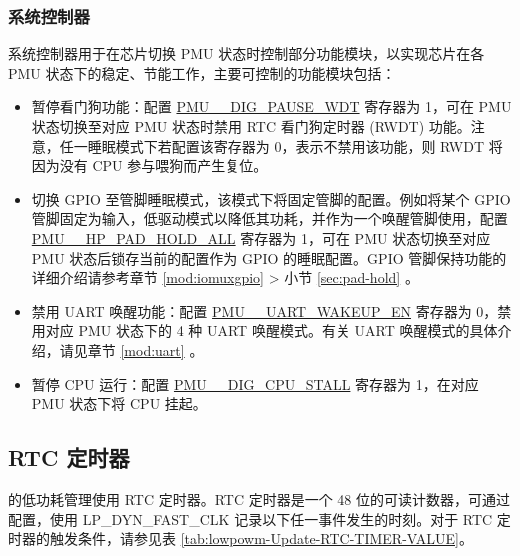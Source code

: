 \documentclass[main\_\_CN.tex]{subfiles}
\begin{document}
\subsubsection{系统控制器}

系统控制器用于在芯片切换 PMU 状态时控制部分功能模块，以实现芯片在各 PMU 状态下的稳定、节能工作，主要可控制的功能模块包括：

\begin{itemize}
    \item 暂停看门狗功能：配置 \hyperref[fielddesc:PMUHPACTIVEDIGPAUSEWDT]{PMU\_\_DIG\_PAUSE\_WDT} 寄存器为 1，可在 PMU 状态切换至对应 PMU 状态时禁用 RTC 看门狗定时器 (RWDT) 功能。注意，任一睡眠模式下若配置该寄存器为 0，表示不禁用该功能，则 RWDT 将因为没有 CPU 参与喂狗而产生复位。

    \item 切换 GPIO 至管脚睡眠模式，该模式下将固定管脚的配置。例如将某个 GPIO 管脚固定为输入，低驱动模式以降低其功耗，并作为一个唤醒管脚使用，配置 \hyperref[fielddesc:PMUHPACTIVEHPPADHOLDALL]{PMU\_\_HP\_PAD\_HOLD\_ALL} 寄存器为 1，可在 PMU 状态切换至对应 PMU 状态后锁存当前的配置作为 GPIO 的睡眠配置。GPIO 管脚保持功能的详细介绍请参考章节 \ref{mod:iomuxgpio} \textit{} > 小节 \ref{sec:pad-hold} \textit{}。

    \item 禁用 UART 唤醒功能：配置 \hyperref[fielddesc:PMUHPACTIVEUARTWAKEUPEN]{PMU\_\_UART\_WAKEUP\_EN} 寄存器为 0，禁用对应 PMU 状态下的 4 种 UART 唤醒模式。有关 UART 唤醒模式的具体介绍，请见章节 \ref{mod:uart} \textit{}。

    \item 暂停 CPU 运行：配置 \hyperref[fielddesc:PMUHPACTIVEDIGCPUSTALL]{PMU\_\_DIG\_CPU\_STALL} 寄存器为 1，在对应 PMU 状态下将 CPU 挂起。
\end{itemize}

\subsection{RTC 定时器}

\chipname{} 的低功耗管理使用 RTC 定时器。RTC 定时器是一个 48 位的可读计数器，可通过配置，使用 LP\_DYN\_FAST\_CLK 记录以下任一事件发生的时刻。对于 RTC 定时器的触发条件，请参见表 \ref{tab:lowpowm-Update-RTC-TIMER-VALUE}。
\end{document}
